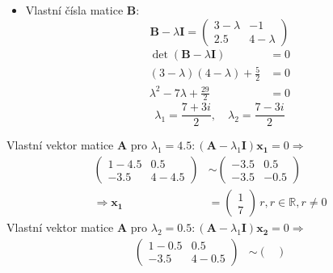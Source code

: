 \begin{example}
    \begin{itemize}
      \item Vlastní čísla matice \textbf{B}:
        \begin{equation*}
             \textbf{B} - \lambda\textbf{I}=
               \begin{pmatrix}
                 3-\lambda  & -1             \\
                 2.5        &  4-\lambda
               \end{pmatrix}
        \end{equation*}
        \begin{align*}
           \det(\mathbf{B}-\lambda\mathbf{I}) &= 0 \\
           (3-\lambda)(4-\lambda)+\frac{5}{2} &= 0 \\
           \lambda^2-7\lambda+\frac{29}{2}    &= 0
        \end{align*}
        \begin{equation*}
           \lambda_1 = \frac{7+3i}{2},\quad \lambda_2 = \frac{7-3i}{2}
        \end{equation*}
    \end{itemize}
  Vlastní vektor matice \(\mathbf{A}\) pro \(\lambda_1=4.5: (\mathbf{A} - 
  \lambda_1\mathbf{I})\mathbf{x_1} = 0 \Rightarrow\)
  \begin{align*}
    \begin{pmatrix}
       1  -4.5  &  0.5     \\
      -3.5      &  4-4.5
    \end{pmatrix}
    &\sim
    \begin{pmatrix}
      -3.5  &  0.5         \\
      -3.5  & -0.5
    \end{pmatrix}          \\
    \Rightarrow\mathbf{x_1} &=
    \begin{pmatrix}
      1 \\ 7
    \end{pmatrix}
    \, r, r\in\mathbb{R}, r\neq0
  \end{align*}
  Vlastní vektor matice \(\mathbf{A}\) pro \(\lambda_2=0.5: (\mathbf{A} - 
  \lambda_1\mathbf{I})\mathbf{x_2}=0 \Rightarrow\)
  \begin{align*}
    \begin{pmatrix}
       1  -0.5  &  0.5   \\
      -3.5      &  4-0.5
    \end{pmatrix}
    &\sim
    \begin{pmatrix}

\end{pmatrix}
\end{align*}
\end{example}
